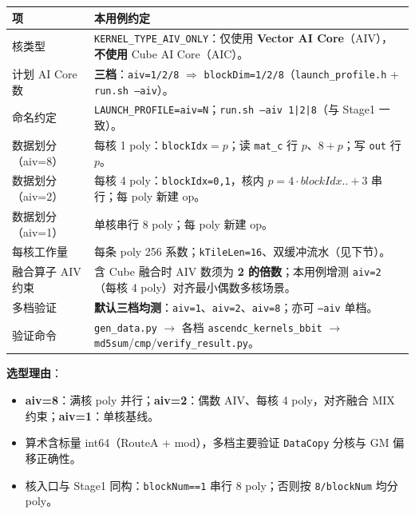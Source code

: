 \documentclass[UTF8,a4paper,11pt]{ctexart}
\begin{document}
\begin{longtable}{@{}L{2.8cm}L{10.5cm}@{}}
\toprule
项 & 本用例约定 \\
\midrule
核类型 & \texttt{KERNEL\_TYPE\_AIV\_ONLY}：仅使用 \textbf{Vector AI Core}（AIV），\textbf{不使用} Cube AI Core（AIC）。 \\
计划 AI Core 数 & \textbf{三档}：\texttt{aiv=1/2/8} $\Rightarrow$ \texttt{blockDim=1/2/8}（\texttt{launch\_profile.h} + \texttt{run.sh --aiv}）。 \\
命名约定 & \texttt{LAUNCH\_PROFILE=aiv=N}；\texttt{run.sh --aiv 1|2|8}（与 Stage1 一致）。 \\
数据划分（aiv=8） & 每核 1 poly：\texttt{blockIdx}$=p$；读 \texttt{mat\_c} 行 $p$、$8+p$；写 \texttt{out} 行 $p$。 \\
数据划分（aiv=2） & 每核 4 poly：\texttt{blockIdx=0,1}，核内 $p=4\cdot blockIdx..+3$ 串行；每 poly 新建 op。 \\
数据划分（aiv=1） & 单核串行 8 poly；每 poly 新建 op。 \\
每核工作量 & 每条 poly 256 系数；\texttt{kTileLen=16}、双缓冲流水（见下节）。 \\
融合算子 AIV 约束 & 含 Cube 融合时 AIV 数须为 \textbf{2 的倍数}；本用例增测 \texttt{aiv=2}（每核 4 poly）对齐最小偶数多核场景。 \\
多档验证 & \textbf{默认三档均测}：\texttt{aiv=1}、\texttt{aiv=2}、\texttt{aiv=8}；亦可 \texttt{--aiv} 单档。 \\
验证命令 & \texttt{gen\_data.py} $\rightarrow$ 各档 \texttt{ascendc\_kernels\_bbit} $\rightarrow$ \texttt{md5sum}/\texttt{cmp}/\texttt{verify\_result.py}。 \\
\bottomrule
\end{longtable}

\textbf{选型理由}：
\begin{itemize}
  \item \textbf{aiv=8}：满核 poly 并行；\textbf{aiv=2}：偶数 AIV、每核 4 poly，对齐融合 MIX 约束；\textbf{aiv=1}：单核基线。
  \item 算术含标量 int64（RouteA + mod），多档主要验证 \texttt{DataCopy} 分核与 GM 偏移正确性。
  \item 核入口与 Stage1 同构：\texttt{blockNum==1} 串行 8 poly；否则按 \texttt{8/blockNum} 均分 poly。
\end{itemize}
\end{document}
